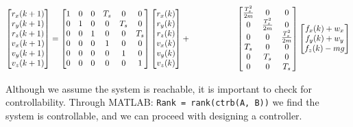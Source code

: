 \documentclass[conference, tikz]{IEEEtran}
\begin{document}
\begin{equation}
    \begin{bmatrix}
        r_x(k+1)\\
        r_y(k+1)\\
        r_z(k+1)\\
        v_x(k+1)\\
        v_y(k+1)\\
        v_z(k+1)\\
    \end{bmatrix}
    =
    \begin{bmatrix}
       1 & 0 & 0 & T_s & 0 & 0\\
       0 & 1 & 0 & 0 & T_s & 0\\
       0 & 0 & 1 & 0 & 0 & T_s\\
       0 & 0 & 0 & 1 & 0 & 0\\
       0 & 0 & 0 & 0 & 1 & 0\\
       0 & 0 & 0 & 0 & 0 & 1
    \end{bmatrix}
    \begin{bmatrix}
        r_x(k)\\
        r_y(k)\\
        r_z(k)\\
        v_x(k)\\
        v_y(k)\\
        v_z(k)\\
    \end{bmatrix}
    +
    \hspace*{2cm}

    \begin{bmatrix}
        \frac{T_s^2}{2m} & 0 & 0\\
        0 & \frac{T_s^2}{2m} & 0\\
        0 & 0 & \frac{T_s^2}{2m}\\
        T_s & 0 & 0\\
        0 & T_s & 0\\
        0 & 0 & T_s
    \end{bmatrix}
    \begin{bmatrix}
        f_x(k)+w_x\\
        f_y(k)+w_y\\
        f_z(k)-mg\\
    \end{bmatrix}


    \label{eq:1}
\end{equation}

Although we assume the system is reachable, it is important to check for controllability. 
Through MATLAB: \verb|Rank = rank(ctrb(A, B))| we find the system is controllable, and we can proceed with designing a controller. 
\end{document}
